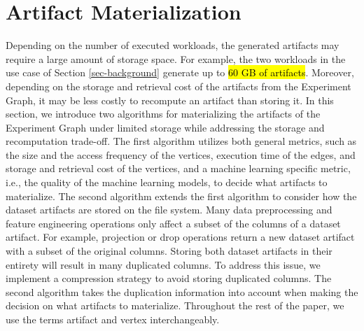 \section{Artifact Materialization}\label{sec-materialization}
Depending on the number of executed workloads, the generated artifacts may require a large amount of storage space.
For example, the two workloads in the use case of Section \ref{sec-background} generate up to \hl{60 GB of artifacts}.
Moreover, depending on the storage and retrieval cost of the artifacts from the Experiment Graph, it may be less costly to recompute an artifact than storing it.
In this section, we introduce two algorithms for materializing the artifacts of the Experiment Graph under limited storage while addressing the storage and recomputation trade-off.
The first algorithm utilizes both general metrics, such as the size and the access frequency of the vertices, execution time of the edges, and storage and retrieval cost of the vertices, and a machine learning specific metric, i.e., the quality of the machine learning models, to decide what artifacts to materialize.
The second algorithm extends the first algorithm to consider how the dataset artifacts are stored on the file system.
Many data preprocessing and feature engineering operations only affect a subset of the columns of a dataset artifact.
For example, projection or drop operations return a new dataset artifact with a subset of the original columns.
Storing both dataset artifacts in their entirety will result in many duplicated columns.
To address this issue, we implement a compression strategy to avoid storing duplicated columns.
The second algorithm takes the duplication information into account when making the decision on what artifacts to materialize.
Throughout the rest of the paper, we use the terms artifact and vertex interchangeably.

